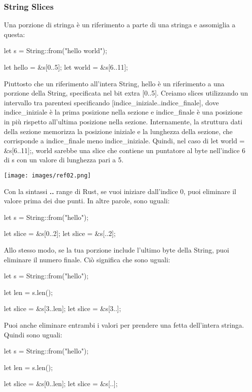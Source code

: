 \documentclass[11pt,a4paper]{article}
\begin{document}
\subsubsection{String Slices}
Una porzione di stringa è un riferimento a parte di una stringa e assomiglia a questa:
\begin{rust}
    let s = String::from("hello world");

    let hello = &s[0..5];
    let world = &s[6..11];
\end{rust}
Piuttosto che un riferimento all'intera String, hello è un riferimento a una porzione della String, specificata nel bit extra [0..5]. Creiamo slices utilizzando un intervallo tra parentesi specificando [indice\_iniziale..indice\_finale], dove indice\_iniziale è la prima posizione nella sezione e indice\_finale è una posizione in più rispetto all'ultima posizione nella sezione. Internamente, la struttura dati della sezione memorizza la posizione iniziale e la lunghezza della sezione, che corrisponde a indice\_finale meno indice\_iniziale. Quindi, nel caso di let world = \&s[6..11];, world sarebbe una slice che contiene un puntatore al byte nell'indice 6 di s con un valore di lunghezza pari a 5.\\
\begin{center}
\texttt{[image: images/ref02.png]}
\end{center}

Con la sintassi \textbf{..} range di Rust, se vuoi iniziare dall'indice 0, puoi eliminare il valore prima dei due punti. In altre parole, sono uguali:
\begin{rust}
let s = String::from("hello");

let slice = &s[0..2];
let slice = &s[..2];
\end{rust}
Allo stesso modo, se la tua porzione include l'ultimo byte della String, puoi eliminare il numero finale. Ciò significa che sono uguali:
\begin{rust}
let s = String::from("hello");

let len = s.len();

let slice = &s[3..len];
let slice = &s[3..];

\end{rust}
Puoi anche eliminare entrambi i valori per prendere una fetta dell'intera stringa. Quindi sono uguali:
\begin{rust}
let s = String::from("hello");

let len = s.len();

let slice = &s[0..len];
let slice = &s[..];
\end{rust}
\end{document}
